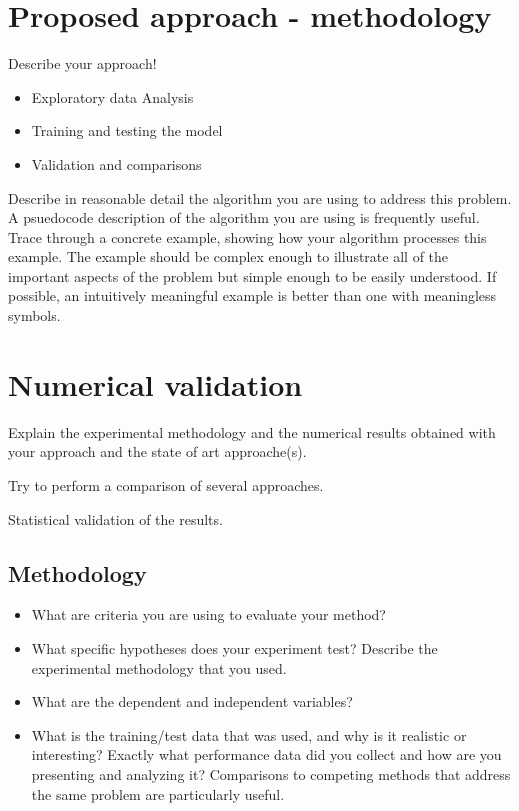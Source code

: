 \documentclass[runningheads,a4paper,11pt]{report}
\begin{document}
\section{Proposed approach - methodology}
\label{section:ProposedApproach}

Describe your approach!

\begin{itemize}
	\item Exploratory data Analysis
	\item Training and testing the model
	\item Validation and comparisons
\end{itemize}

Describe in reasonable detail the algorithm you are using to address this problem. A psuedocode description of the algorithm you are using is frequently useful. Trace through a concrete example, showing how your algorithm processes this example. The example should be complex enough to illustrate all of the important aspects of the problem but simple enough to be easily understood. If possible, an intuitively meaningful example is better than one with meaningless symbols.


\section{Numerical validation}
\label{section:numericalValidaion}


Explain the experimental methodology and the numerical results obtained with your approach and the state of art approache(s).

Try to perform a comparison of several approaches.

Statistical validation of the results.


\subsection{Methodology}
\label{section:methodology}

\begin{itemize}
	\item What are criteria you are using to evaluate your method? 
	\item What specific hypotheses does your experiment test? Describe the experimental methodology that you used. 
	\item What are the dependent and independent variables? 
	\item What is the training/test data that was used, and why is it realistic or interesting? Exactly what performance data did you collect and how are you presenting and analyzing it? Comparisons to competing methods that address the same problem are particularly useful.
\end{itemize}
\end{document}
